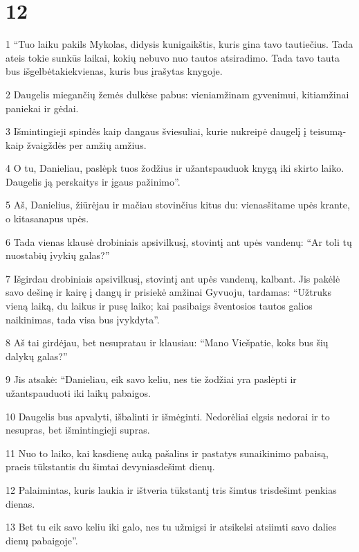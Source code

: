 \chapter{12}


\par 1 “Tuo laiku pakils Mykolas, didysis kunigaikštis, kuris gina tavo tautiečius. Tada ateis tokie sunkūs laikai, kokių nebuvo nuo tautos atsiradimo. Tada tavo tauta bus išgelbėta­kiekvienas, kuris bus įrašytas knygoje. 
\par 2 Daugelis miegančių žemės dulkėse pabus: vieni­amžinam gyvenimui, kiti­amžinai paniekai ir gėdai. 
\par 3 Išmintingieji spindės kaip dangaus šviesuliai, kurie nukreipė daugelį į teisumą­kaip žvaigždės per amžių amžius. 
\par 4 O tu, Danieliau, paslėpk tuos žodžius ir užantspauduok knygą iki skirto laiko. Daugelis ją perskaitys ir įgaus pažinimo”. 
\par 5 Aš, Danielius, žiūrėjau ir mačiau stovinčius kitus du: vienas­šitame upės krante, o kitas­anapus upės. 
\par 6 Tada vienas klausė drobiniais apsivilkusį, stovintį ant upės vandenų: “Ar toli tų nuostabių įvykių galas?” 
\par 7 Išgirdau drobiniais apsivilkusį, stovintį ant upės vandenų, kalbant. Jis pakėlė savo dešinę ir kairę į dangų ir prisiekė amžinai Gyvuoju, tardamas: “Užtruks vieną laiką, du laikus ir pusę laiko; kai pasibaigs šventosios tautos galios naikinimas, tada visa bus įvykdyta”. 
\par 8 Aš tai girdėjau, bet nesupratau ir klausiau: “Mano Viešpatie, koks bus šių dalykų galas?” 
\par 9 Jis atsakė: “Danieliau, eik savo keliu, nes tie žodžiai yra paslėpti ir užantspauduoti iki laikų pabaigos. 
\par 10 Daugelis bus apvalyti, išbalinti ir išmėginti. Nedorėliai elgsis nedorai ir to nesupras, bet išmintingieji supras. 
\par 11 Nuo to laiko, kai kasdienę auką pašalins ir pastatys sunaikinimo pabaisą, praeis tūkstantis du šimtai devyniasdešimt dienų. 
\par 12 Palaimintas, kuris laukia ir ištveria tūkstantį tris šimtus trisdešimt penkias dienas. 
\par 13 Bet tu eik savo keliu iki galo, nes tu užmigsi ir atsikelsi atsiimti savo dalies dienų pabaigoje”.





